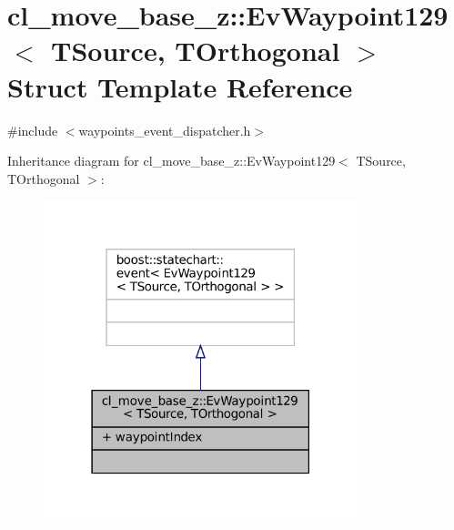 \hypertarget{structcl__move__base__z_1_1EvWaypoint129}{}\section{cl\+\_\+move\+\_\+base\+\_\+z\+:\+:Ev\+Waypoint129$<$ T\+Source, T\+Orthogonal $>$ Struct Template Reference}
\label{structcl__move__base__z_1_1EvWaypoint129}


{\ttfamily \#include $<$waypoints\+\_\+event\+\_\+dispatcher.\+h$>$}



Inheritance diagram for cl\+\_\+move\+\_\+base\+\_\+z\+:\+:Ev\+Waypoint129$<$ T\+Source, T\+Orthogonal $>$\+:
\nopagebreak
\begin{figure}[H]
\begin{center}
\leavevmode
\includegraphics[width=259pt]{structcl__move__base__z_1_1EvWaypoint129__inherit__graph}
\end{center}
\end{figure}


